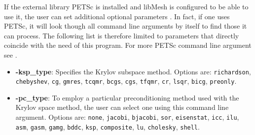   If the external library PETSc is installed and libMesh is configured to be able to use it, the user can set additional optional parameters \cite{petsc-user-ref}. In fact, if one uses PETSc, it will look though all command line arguments by itself to find those it can process. The following list is therefore limited to parameters that directly coincide with the need of this program. For more PETSc command line argument see \cite{petsc-user-ref}.
  \begin{itemize}
  	\item \textbf{-ksp\_type}: Specifies the Krylov subspace method. Options are: \texttt{richardson}, \texttt{chebyshev}, \texttt{cg}, \texttt{gmres}, \texttt{tcqmr}, \texttt{bcgs}, \texttt{cgs}, \texttt{tfqmr}, \texttt{cr}, \texttt{lsqr}, \texttt{bicg}, \texttt{preonly}.
  	\item \textbf{-pc\_type}: To employ a particular preconditioning method used with the Krylov space method, the user can select one using this command line argument. Options are: \texttt{none}, \texttt{jacobi}, \texttt{bjacobi}, \texttt{sor}, \texttt{eisenstat}, \texttt{icc}, \texttt{ilu}, \texttt{asm}, \texttt{gasm}, \texttt{gamg}, \texttt{bddc}, \texttt{ksp}, \texttt{composite}, \texttt{lu}, \texttt{cholesky}, \texttt{shell}. 
  \end{itemize}
   
   
   
